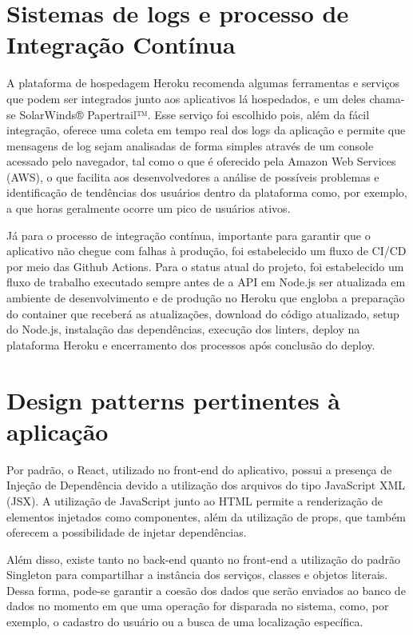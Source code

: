\section{Sistemas de logs e processo de Integração Contínua}
A plataforma de hospedagem Heroku recomenda algumas ferramentas e serviços que podem ser integrados junto aos aplicativos lá hospedados, e um deles chama-se SolarWinds® Papertrail™. Esse serviço foi escolhido pois, além da fácil integração, oferece uma coleta em tempo real dos logs da aplicação e permite que mensagens de log sejam analisadas de forma simples através de um console acessado pelo navegador, tal como o que é oferecido pela Amazon Web Services (AWS), o que facilita aos desenvolvedores a análise de possíveis problemas e identificação de tendências dos usuários dentro da plataforma como, por exemplo, a que horas geralmente ocorre um pico de usuários ativos.

Já para o processo de integração contínua, importante para garantir que o aplicativo não chegue com falhas à produção, foi estabelecido um fluxo de CI/CD por meio das Github Actions. Para o status atual do projeto, foi estabelecido um fluxo de trabalho executado sempre antes de a API em Node.js ser atualizada em ambiente de desenvolvimento e de produção no Heroku que engloba a preparação do container que receberá as atualizações, download do código atualizado, setup do Node.js, instalação das dependências, execução dos linters, deploy na plataforma Heroku e encerramento dos processos após conclusão do deploy.


\section{Design patterns pertinentes à aplicação}
Por padrão, o React, utilizado no front-end do aplicativo, possui a presença de Injeção de 
Dependência devido a utilização dos arquivos do tipo JavaScript XML (JSX). A utilização de JavaScript junto ao HTML permite a renderização de elementos injetados como componentes, além da utilização de props, que também oferecem a possibilidade de injetar dependências. 

Além disso, existe tanto no back-end quanto no front-end a utilização do padrão Singleton para compartilhar a instância dos serviços, classes e objetos literais. Dessa forma, pode-se garantir a coesão dos dados que serão enviados ao banco de dados no momento em que uma operação for disparada no sistema, como, por exemplo, o cadastro do usuário ou a busca de uma localização específica.


